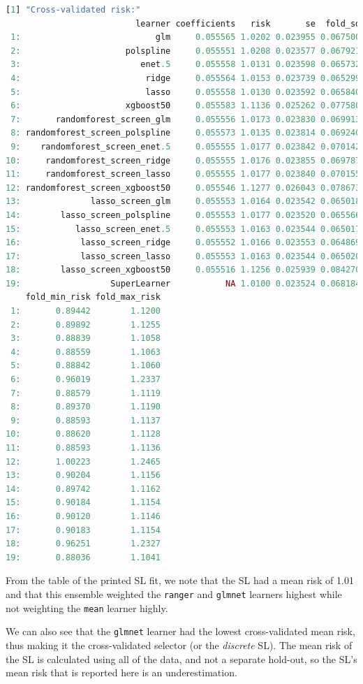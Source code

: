 \documentclass[12pt, krantz2,]{krantz}
\newcommand{\passthrough}[1]{#1}
\theoremstyle{definition}
\theoremstyle{definition}
\theoremstyle{definition}
\newcommand{\1}{\mathbbm{1}}
\begin{document}
\begin{lstlisting}[language=R]
[1] "Cross-validated risk:"
                          learner coefficients   risk       se  fold_sd
 1:                           glm     0.055565 1.0202 0.023955 0.067500
 2:                     polspline     0.055551 1.0208 0.023577 0.067921
 3:                        enet.5     0.055558 1.0131 0.023598 0.065732
 4:                         ridge     0.055564 1.0153 0.023739 0.065299
 5:                         lasso     0.055558 1.0130 0.023592 0.065840
 6:                     xgboost50     0.055583 1.1136 0.025262 0.077580
 7:       randomforest_screen_glm     0.055556 1.0173 0.023830 0.069913
 8: randomforest_screen_polspline     0.055573 1.0135 0.023814 0.069240
 9:    randomforest_screen_enet.5     0.055555 1.0177 0.023842 0.070142
10:     randomforest_screen_ridge     0.055555 1.0176 0.023855 0.069787
11:     randomforest_screen_lasso     0.055555 1.0177 0.023840 0.070155
12: randomforest_screen_xgboost50     0.055546 1.1277 0.026043 0.078673
13:              lasso_screen_glm     0.055553 1.0164 0.023542 0.065018
14:        lasso_screen_polspline     0.055553 1.0177 0.023520 0.065566
15:           lasso_screen_enet.5     0.055553 1.0163 0.023544 0.065017
16:            lasso_screen_ridge     0.055552 1.0166 0.023553 0.064869
17:            lasso_screen_lasso     0.055553 1.0163 0.023544 0.065020
18:        lasso_screen_xgboost50     0.055516 1.1256 0.025939 0.084270
19:                  SuperLearner           NA 1.0100 0.023524 0.068184
    fold_min_risk fold_max_risk
 1:       0.89442        1.1200
 2:       0.89892        1.1255
 3:       0.88839        1.1058
 4:       0.88559        1.1063
 5:       0.88842        1.1060
 6:       0.96019        1.2337
 7:       0.88579        1.1119
 8:       0.89370        1.1190
 9:       0.88593        1.1137
10:       0.88620        1.1128
11:       0.88593        1.1136
12:       1.00223        1.2465
13:       0.90204        1.1156
14:       0.89742        1.1162
15:       0.90184        1.1154
16:       0.90120        1.1146
17:       0.90183        1.1154
18:       0.96251        1.2327
19:       0.88036        1.1041
\end{lstlisting}

From the table of the printed SL fit, we note that the SL had a mean risk of
1.01 and that
this ensemble weighted the \passthrough{\lstinline!ranger!} and \passthrough{\lstinline!glmnet!} learners highest while not
weighting the \passthrough{\lstinline!mean!} learner highly.

We can also see that the \passthrough{\lstinline!glmnet!} learner had the lowest cross-validated mean
risk, thus making it the cross-validated selector (or the \emph{discrete} SL). The
mean risk of the SL is calculated using all of the data, and not a separate
hold-out, so the SL's mean risk that is reported here is an underestimation.
\end{document}
